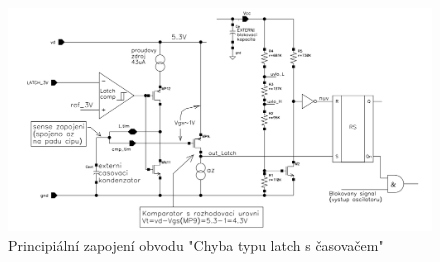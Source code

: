 \begin{figure}[h]
   \begin{center}
     \includegraphics[scale=0.5]{images/Latch2.png}
   \end{center}
   \caption{Principiální zapojení obvodu "Chyba typu latch s časovačem"}
\end{figure}
